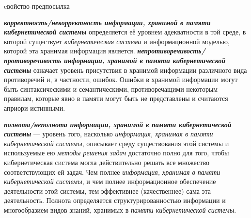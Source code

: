 \begin{SCn}
\begin{scnrelfromlist}{cвойство-предпосылка}
\end{scnrelfromlist}
\end{SCn}

\textbf{\textit{корректность/некорректность информации, хранимой в памяти кибернетической системы}} определяется её уровнем адекватности в той среде, в которой существует \textit{кибернетическая система} и информационной моделью, которой эта хранимая информация является. 
\textbf{\textit{непротиворечивость/противоречивость информации, хранимой в памяти кибернетической системы}} означает уровень присутствия в хранимой информации различного вида противоречий и, в частности, ошибок. 
Ошибки в хранимой информации могут быть синтаксическими и семантическими, противоречащими некоторым правилам, которые явно в памяти могут быть не представлены и считаются априори истинными.

\textbf{\textit{полнота/неполнота информации, хранимой в памяти кибернетической системы}} --- уровень того, насколько \textit{информация, хранимая в памяти кибернетической системы}, описывает среду существования этой системы и используемые ею \textit{методы решения задач} достаточно полно для того, чтобы кибернетическая система могла действительно решать все множество соответствующих ей задач. 
Чем полнее \textit{информация, хранимая в памяти кибернетической системы}, и чем полнее информационное обеспечение деятельности этой системы, тем эффективнее (качественнее) сама эта деятельность. 
Полнота определяется структурированностью информации и многообразием видов знаний, хранимых в \textit{памяти кибернетической системы}.

